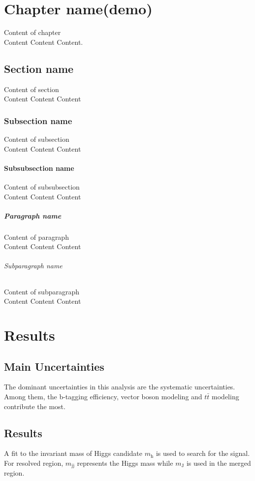 \documentclass[class=NCU_thesis, crop=false]{standalone}
\begin{document}
\chapter{Chapter name(demo)}
Content of chapter \\
Content Content Content.

\section{Section name}
Content of section \\
Content Content Content
\subsection{Subsection name}
Content of subsection \\
Content Content Content

\subsubsection{Subsubsection name}
Content of subsubsection \\
Content Content Content

\paragraph{Paragraph name}
Content of paragraph \\
Content Content Content

\subparagraph{Subparagraph name}
Content of subparagraph \\
Content Content Content


\chapter{Results}

\section{Main Uncertainties}
	The dominant uncertainties in this analysis are the systematic uncertainties. Among them, the b-tagging efficiency, vector boson modeling and $t\bar{t}$ modeling contribute the most.
	
\section{Results}
	A fit to the invariant mass of Higgs candidate $m_{\mathrm{h}}$ is used to search for the signal. For resolved region, $m_{\mathrm{jj}}$ represents the Higgs mass while $m_{\mathrm{J}}$ is used in the merged region.
	
\end{document}
